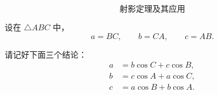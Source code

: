 \[
\text{射影定理及其应用}
\]

设在 \(\triangle ABC\) 中，
\[
a=BC,\qquad b=CA,\qquad c=AB.
\]

请记好下面三个结论：
\[
\begin{aligned}
a&=b\cos C+c\cos B,\\
b&=c\cos A+a\cos C,\\
c&=a\cos B+b\cos A.
\end{aligned}
\]